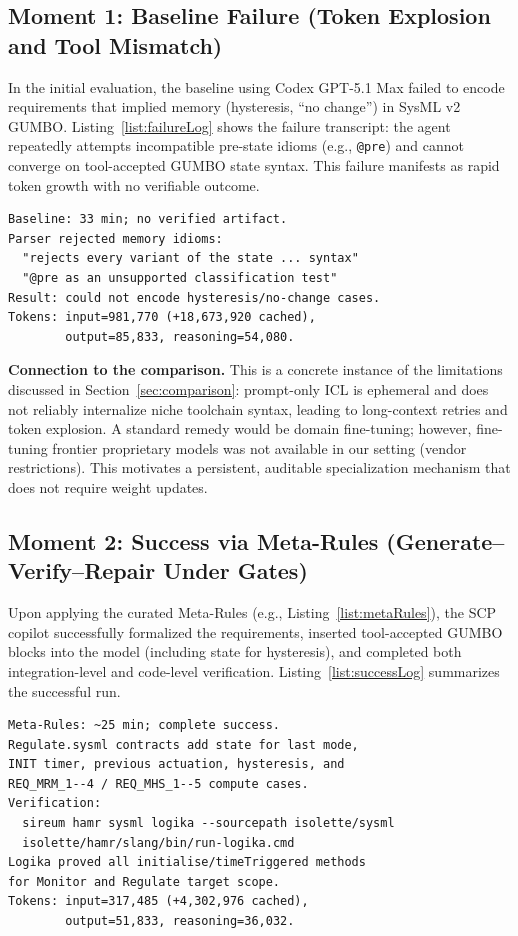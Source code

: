 \documentclass[conference]{IEEEtran}
\begin{document}
\subsection{Moment 1: Baseline Failure (Token Explosion and Tool Mismatch)}
In the initial evaluation, the baseline using Codex GPT-5.1 Max failed to encode requirements that implied memory (hysteresis, ``no change'') in SysML v2 GUMBO. Listing~\ref{list:failureLog} shows the failure transcript: the agent repeatedly attempts incompatible pre-state idioms (e.g., \texttt{@pre}) and cannot converge on tool-accepted GUMBO state syntax. This failure manifests as rapid token growth with no verifiable outcome.

\begin{lstlisting}[caption={Condensed baseline failure excerpt: parser rejection and high token usage.}, label={list:failureLog}, float=t]
Baseline: 33 min; no verified artifact.
Parser rejected memory idioms:
  "rejects every variant of the state ... syntax"
  "@pre as an unsupported classification test"
Result: could not encode hysteresis/no-change cases.
Tokens: input=981,770 (+18,673,920 cached),
        output=85,833, reasoning=54,080.
\end{lstlisting}

\textbf{Connection to the comparison.} This is a concrete instance of the limitations discussed in Section~\ref{sec:comparison}: prompt-only ICL is ephemeral and does not reliably internalize niche toolchain syntax, leading to long-context retries and token explosion. A standard remedy would be domain fine-tuning; however, fine-tuning frontier proprietary models was not available in our setting (vendor restrictions). This motivates a persistent, auditable specialization mechanism that does not require weight updates.

\subsection{Moment 2: Success via Meta-Rules (Generate--Verify--Repair Under Gates)}
Upon applying the curated Meta-Rules (e.g., Listing~\ref{list:metaRules}), the SCP copilot successfully formalized the requirements, inserted tool-accepted GUMBO blocks into the model (including state for hysteresis), and completed both integration-level and code-level verification. Listing~\ref{list:successLog} summarizes the successful run.

\begin{lstlisting}[caption={Condensed Meta-Rule-guided success excerpt: verified target scope.}, label={list:successLog}, float=t]
Meta-Rules: ~25 min; complete success.
Regulate.sysml contracts add state for last mode,
INIT timer, previous actuation, hysteresis, and
REQ_MRM_1--4 / REQ_MHS_1--5 compute cases.
Verification:
  sireum hamr sysml logika --sourcepath isolette/sysml
  isolette/hamr/slang/bin/run-logika.cmd
Logika proved all initialise/timeTriggered methods
for Monitor and Regulate target scope.
Tokens: input=317,485 (+4,302,976 cached),
        output=51,833, reasoning=36,032.
\end{lstlisting}
\end{document}
